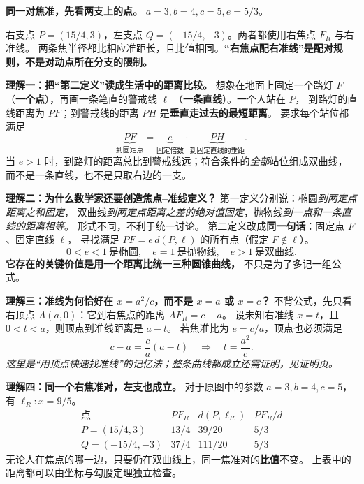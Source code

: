 \clearpage
\begin{explanationbox}
\textbf{同一对焦准，先看两支上的点。} $a=3,b=4,c=5,e=5/3$。

右支点 $P=(15/4,3)$，左支点 $Q=(-15/4,-3)$。两者都使用右焦点 $F_R$ 与右准线。
两条焦半径都比相应准距长，且比值相同。\textbf{“右焦点配右准线”是配对规则，不是对动点所在分支的限制。}
\end{explanationbox}
\clearpage
\clearpage
\begin{explanationbox}
\medskip
\textbf{理解一：把“第二定义”读成生活中的距离比较。}
想象在地面上固定一个路灯 $F$（\textbf{一个点}），再画一条笔直的警戒线 $\ell$
（\textbf{一条直线}）。一个人站在 $P$，
到路灯的直线距离为 $PF$；到警戒线的距离 $PH$ 是\textbf{垂直走过去的最短距离}。
要求每个站位都满足
\[
\underbrace{PF}_{\text{到固定点}}=
\underbrace{e}_{\text{固定倍数}}\cdot
\underbrace{PH}_{\text{到固定直线的垂距}}.
\]
当 $e>1$ 时，到路灯的距离总比到警戒线远；符合条件的\emph{全部}站位组成双曲线，
而不是一条直线，也不是只取右边的一支。

\textbf{理解二：为什么数学家还要创造焦点--准线定义？}
第一定义分别说：椭圆\emph{到两定点距离之和固定}，
双曲线\emph{到两定点距离之差的绝对值固定}，抛物线\emph{到一点和一条直线的距离相等}。
形式不同，不利于统一讨论。
第二定义改成\textbf{同一句话}：固定点 $F$、固定直线 $\ell$，
寻找满足 $PF=e\,d(P,\ell)$ 的所有点（假定 $F\notin\ell$）。
\[
\boxed{0<e<1\ \text{是椭圆},\quad
 e=1\ \text{是抛物线},\quad
 e>1\ \text{是双曲线}.}
\]
\textbf{它存在的关键价值是用一个距离比统一三种圆锥曲线，}
不只是为了多记一组公式。

\textbf{理解三：准线为何恰好在 $x=a^2/c$，而不是 $x=a$ 或 $x=c$？}
不背公式，先只看右顶点 $A(a,0)$：它到右焦点的距离 $AF_R=c-a$。
设未知右准线 $x=t$，且 $0<t<a$，则顶点到准线距离是 $a-t$。
若焦准比为 $e=c/a$，顶点也必须满足
\[
 c-a=\frac ca(a-t)
 \quad\Longrightarrow\quad
 \boxed{t=\frac{a^2}{c}}.
\]
\emph{这里是“用顶点快速找准线”的记忆法；整条曲线都成立还需证明，见证明页。}
\end{explanationbox}
\clearpage
\begin{explanationbox}
\textbf{理解四：同一个右焦准对，左支也成立。}
对于原图中的参数 $a=3,b=4,c=5$，有 $\ell_R:x=9/5$。
\[
\begin{array}{c|c|c|c}
\text{点}&PF_R&d(P,\ell_R)&PF_R/d\\ \hline
P=(15/4,3)&13/4&39/20&5/3\\
Q=(-15/4,-3)&37/4&111/20&5/3
\end{array}
\]
无论人在焦点的哪一边，只要仍在双曲线上，同一焦准对的\textbf{比值}不变。
上表中的距离都可以由坐标与勾股定理独立检查。

\end{explanationbox}
